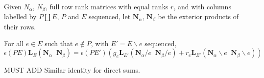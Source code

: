 \documentclass[Unicode]{cedram-alco}
\newcommand{\ext}[1]{\ensuremath{\mathbf{#1}}}
\newcommand{\eNal}{\ensuremath{\ext{N}_{\alpha}}}
\newcommand{\eNbe}{\ensuremath{\ext{N}_\beta}}
\newcommand{\dunion}{\coprod}
\newcommand{\extLHorSub}[3]{\ext{L}_{#1}\left(  {#2}\;\; {#3}  \right)}
\begin{document}
\begin{theo}
  Given $N_\alpha$, $N_\beta$, full row rank matrices with equal ranks $r$, and
  with columns labelled by
  $P\dunion E$, $P$ and $E$ sequenced, let $\eNal$, $\eNbe$ be the exterior products of their rows.


  
  For all $e\in E$ such that $e\not\in P$, with $E'=E\backslash e$ sequenced,
  \begin{equation}\label{delecontrequation}
     \epsilon(PE)\extLHorSub{E}{\eNal}{\eNbe}=
      \epsilon(PE')
      \left(
      g_e\extLHorSub{E'}{\eNal/e}{\eNbe/e} +
      r_e\extLHorSub{E'}{\eNal\backslash e}{\eNbe\backslash e}\right)
  \end{equation}
  
  MUST ADD Similar identity for direct sums.

\end{theo}
  
\end{document}
